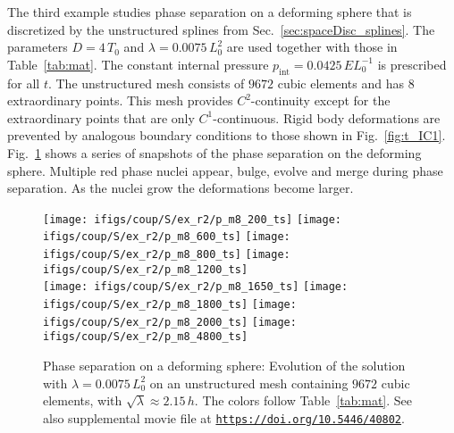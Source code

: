 \documentclass[11pt]{article}
\begin{document}
The third example studies phase separation on a deforming sphere that is discretized by the unstructured splines from Sec.~\ref{sec:spaceDisc_splines}. 
The parameters $D=4\,T_0$ and $\lambda=0.0075\,L_0^2$ are used together with those in Table~\ref{tab:mat}.
The constant internal pressure $p_{\mathrm{int}}=0.0425\,EL_0^{-1}$ is prescribed for all $t$. 
The unstructured mesh consists of $9672$ cubic elements and has $8$ extraordinary points.
This mesh provides $C^2$-continuity except for the extraordinary points that are only $C^1$-continuous. 
Rigid body deformations are prevented by analogous boundary conditions to those shown in Fig.~\ref{fig:t_IC1}. 
Fig.~\ref{fig:s_evo2} shows a series of snapshots of the phase separation on the deforming sphere. 
Multiple red phase nuclei appear, bulge, evolve and merge during phase separation.  
As the nuclei grow the deformations become larger.
\begin{figure}[H]
\centering
\texttt{[image: ifigs/coup/S/ex\_r2/p\_m8\_200\_ts]}
\texttt{[image: ifigs/coup/S/ex\_r2/p\_m8\_600\_ts]}
\texttt{[image: ifigs/coup/S/ex\_r2/p\_m8\_800\_ts]}
\texttt{[image: ifigs/coup/S/ex\_r2/p\_m8\_1200\_ts]}
\\
\texttt{[image: ifigs/coup/S/ex\_r2/p\_m8\_1650\_ts]}
\texttt{[image: ifigs/coup/S/ex\_r2/p\_m8\_1800\_ts]}
\texttt{[image: ifigs/coup/S/ex\_r2/p\_m8\_2000\_ts]}
\texttt{[image: ifigs/coup/S/ex\_r2/p\_m8\_4800\_ts]}
\caption{Phase separation on a deforming sphere: Evolution of the solution with $\lambda=0.0075\,L_0^2$ on an unstructured mesh containing $9672$ cubic elements, with $\sqrt{\lambda}\approx 2.15\,h$. The colors follow Table~\ref{tab:mat}. See also supplemental movie file at \href{https://doi.org/10.5446/40802}{\texttt{https://doi.org/10.5446/40802}}.}
\label{fig:s_evo2}
\end{figure}
\end{document}
